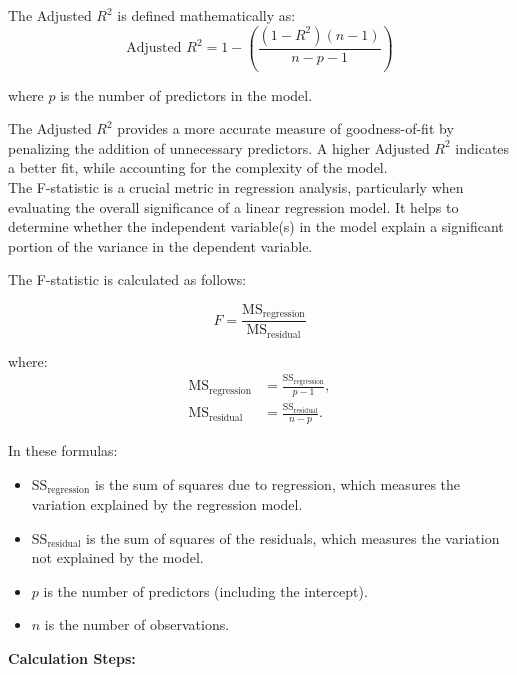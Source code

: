 \begin{definition} The Adjusted \( R^2 \) is defined mathematically as:
    \[
\text{Adjusted } R^2 = 1 - \left( \frac{(1 - R^2)(n - 1)}{n - p - 1} \right)
\]

where \(p\) is the number of predictors in the model.
\end{definition}

The Adjusted \(R^2\) provides a more accurate measure of goodness-of-fit by penalizing the addition of unnecessary predictors. A higher Adjusted \(R^2\) indicates a better fit, while accounting for the complexity of the model.\\

The F-statistic is a crucial metric in regression analysis, particularly when evaluating the overall significance of a linear regression model. It helps to determine whether the independent variable(s) in the model explain a significant portion of the variance in the dependent variable. \\

\begin{definition}
    The F-statistic is calculated as follows:

    \[
    F = \frac{\text{MS}_{\text{regression}}}{\text{MS}_{\text{residual}}}
    \]

    where:
    \begin{align*}
    \text{MS}_{\text{regression}} & = \frac{\text{SS}_{\text{regression}}}{p - 1}, \\
    \text{MS}_{\text{residual}} & = \frac{\text{SS}_{\text{residual}}}{n - p}.
    \end{align*}

    In these formulas:
    \begin{itemize}
        \item \(\text{SS}_{\text{regression}}\) is the sum of squares due to regression, which measures the variation explained by the regression model.
        \item \(\text{SS}_{\text{residual}}\) is the sum of squares of the residuals, which measures the variation not explained by the model.
        \item \(p\) is the number of predictors (including the intercept).
        \item \(n\) is the number of observations.
    \end{itemize}
\end{definition}

\textbf{Calculation Steps:}


